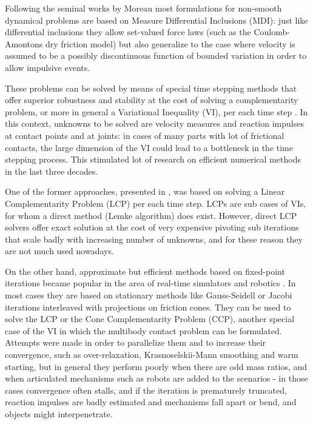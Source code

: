 \documentclass{svproc}
\begin{document}
Following the seminal works by Moreau 
\cite{mor88,Jean1992} 
most formulations for non-smooth dynamical problems are based on Measure Differential Inclusions (MDI): just like differential inclusions they allow set-valued force laws (such as the Coulomb-Amontons dry friction model) but also generalize to the case where velocity is assumed to be a possibly discontinuous function of bounded variation in order to allow impulsive events.

These problems can be solved by means of special time stepping methods that offer superior robustness and stability at the cost of solving a complementarity problem, or more in general a Variational Inequality (VI), per each time step
 \cite{acary2008numerical}. 
In this context, unknowns to be solved are velocity measures and reaction impulses at contact points and at joints: in cases of many parts with lot of frictional contacts, the large dimension of the VI could lead to a bottleneck in the time stepping process. This stimulated lot of research on efficient numerical methods in the last three decades.  

One of the former approaches, presented in 
\cite{StTr95}  %
, was based on solving a Linear Complementarity Problem (LCP) per each time step. LCPs are sub cases of VIs, for whom a direct method (Lemke algorithm) does exist. However, direct LCP solvers offer exact solution at the cost of very expensive pivoting sub iterations that scale badly with increasing number of unknowns, and for these reason they are not much used nowadays.

On the other hand, approximate but efficient methods based on fixed-point iterations became popular in the area of real-time simulators and robotics \cite{Bender2014}.
In most cases they are based on stationary methods like Gauss-Seidell or Jacobi iterations interleaved with projections on friction cones. They can be used to solve the LCP or the Cone Complementarity Problem (CCP), another special case of the VI in which the multibody contact problem can be formulated.
Attempts were made in order to parallelize them and to increase their convergence, such as over-relaxation, Krasnoselskii-Mann smoothing and warm starting, 
\cite{massSplittingRichard2012,TasoraAnitescuCMAME10} %
but in general they perform poorly when there are odd mass ratios, and when articulated mechanisms such as robots are added to the scenarios - in those cases convergence often stalls, and if the iteration is prematurely truncated, reaction impulses are badly estimated and mechanisms fall apart or bend, and objects might interpenetrate. 
\end{document}

